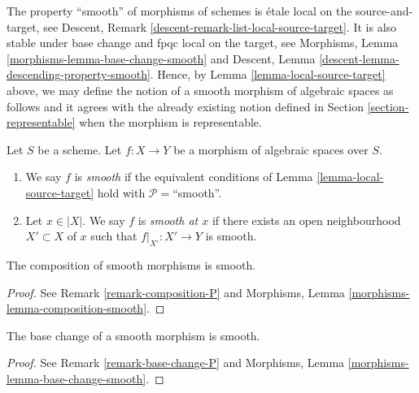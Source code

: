 \noindent
The property ``smooth'' of morphisms of schemes is
\'etale local on the source-and-target, see
Descent, Remark \ref{descent-remark-list-local-source-target}.
It is also stable under base change and fpqc local on the target, see
Morphisms, Lemma \ref{morphisms-lemma-base-change-smooth}
and
Descent, Lemma \ref{descent-lemma-descending-property-smooth}.
Hence, by
Lemma \ref{lemma-local-source-target}
above, we may define the notion of a smooth morphism of algebraic spaces as
follows and it agrees with the already existing notion defined in
Section \ref{section-representable}
when the morphism is representable.

\begin{definition}
\label{definition-smooth}
Let $S$ be a scheme.
Let $f : X \to Y$ be a morphism of algebraic spaces over $S$.
\begin{enumerate}
\item We say $f$ is {\it smooth} if the equivalent conditions of
Lemma \ref{lemma-local-source-target} hold with
$\mathcal{P} =$``smooth''.
\item Let $x \in |X|$. We say $f$ is {\it smooth at $x$} if there exists
an open neighbourhood $X' \subset X$ of $x$ such that $f|_{X'} : X' \to Y$
is smooth.
\end{enumerate}
\end{definition}

\begin{lemma}
\label{lemma-composition-smooth}
The composition of smooth morphisms is smooth.
\end{lemma}

\begin{proof}
See Remark \ref{remark-composition-P} and
Morphisms, Lemma \ref{morphisms-lemma-composition-smooth}.
\end{proof}

\begin{lemma}
\label{lemma-base-change-smooth}
The base change of a smooth morphism is smooth.
\end{lemma}

\begin{proof}
See Remark \ref{remark-base-change-P} and
Morphisms, Lemma \ref{morphisms-lemma-base-change-smooth}.
\end{proof}

